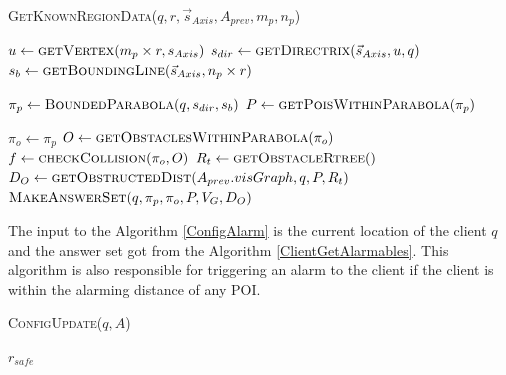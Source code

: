 \begin{algorithm}
\caption{\textsc{GetKnownRegionData}($q, r, \vec{s}_{Axis}, A_{prev}, m_p, n_p$)}
\label{getKnownRegionData}
	
	$u \gets \textsc{getVertex}(m_p \times r, s_{Axis})$ \;
   	$s_{dir} \gets \textsc{getDirectrix}(\vec{s}_{Axis}, u, q)$\;
	$s_b \gets \textsc{getBoundingLine}(\vec{s}_{Axis}, n_p \times r) $\;
	
	$\pi_p \gets \textsc{BoundedParabola}( q, s_{dir}, s_b)$\;
	$P \gets \textsc{getPoisWithinParabola}( \pi_p )$\;
	
	$ \pi_o \gets \pi_p$\;
	$O \gets \textsc{getObstaclesWithinParabola}( \pi_o )$\;
	$f \gets \textsc{checkCollision}(\pi_o, O)$\;
  	$ R_t \gets \textsc{getObstacleRtree}()$\;
  	$ D_O \gets \textsc{getObstructedDist}(A_{prev}.visGraph, q, P, R_t) $\;
	\Return $\textsc{MakeAnswerSet}(q, \pi_p, \pi_o, P, V_G, D_O)  $\;
	
\end{algorithm}

The input to the Algorithm \ref{ConfigAlarm} is the current location of the client $q$ and the answer set got from the Algorithm \ref{ClientGetAlarmables}. This algorithm is also responsible for triggering an alarm to the client if the client is within the alarming distance of any POI.
\begin{algorithm}
\caption{\textsc{ConfigUpdate}($q, A$)}
\label{ConfigAlarm}

    
    
    
    \Return $r_{safe}$

\end{algorithm}

